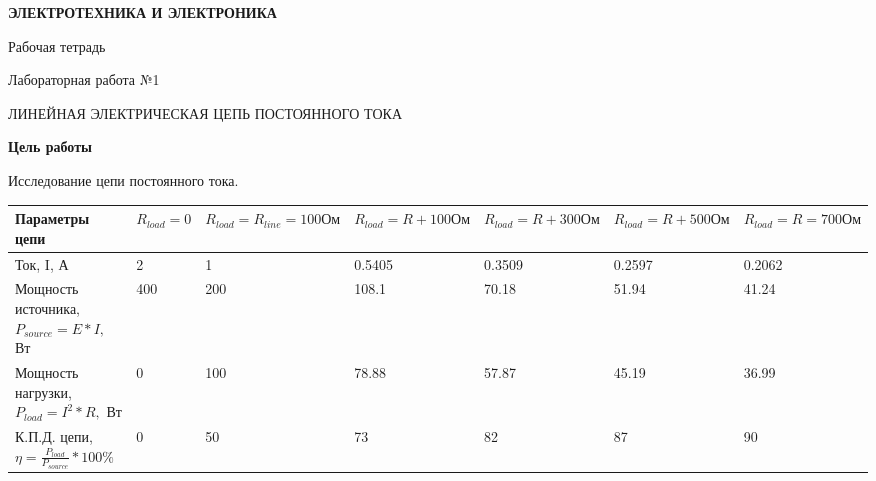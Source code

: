 \documentclass[12pt, a4paper]{report}
\begin{document}

	\begin{titlepage}
		\begin{center}
			\vspace*{1.5cm}

			\LARGE
			\textbf{ЭЛЕКТРОТЕХНИКА И ЭЛЕКТРОНИКА}

			\vspace{5cm}

			\Huge
			Рабочая тетрадь
		\end{center}
	\end{titlepage}
	
	\begin{center}
		Лабораторная работа №1
		
		\large ЛИНЕЙНАЯ ЭЛЕКТРИЧЕСКАЯ ЦЕПЬ ПОСТОЯННОГО ТОКА	

		\textbf{Цель работы}
	\end{center}
	Исследование цепи постоянного тока.
	\newline

	\begin{tabular}{||M{4cm} | M{1.5cm} | M{1.5cm} | M{1.5cm} | M{1.5cm} | M{1.5cm} | M{1.5cm}||}
		\hline 
		Параметры цепи & \( R_{load} = 0 \) & \( R_{load} = R_{line} = 100 Ом \) & \( R_{load} = R + 100 Ом \) & \( R_{load} = R + 300 Ом \) & \( R_{load} = R + 500 Ом \) & \( R_{load} = R = 700 Ом \) \\

		\hline
		Ток, I, А & 2 & 1 & 0.5405 & 0.3509 & 0.2597 & 0.2062 \\

		\hline 
		Мощность источника, \newline \( P_{source} = E*I, \) Вт & 400 & 200 & 108.1 & 70.18 & 51.94 & 41.24 \\

		\hline
		Мощность нагрузки, \newline \( P_{load} = I^2*R, \) Вт & 0 & 100 & 78.88 & 57.87 & 45.19 & 36.99 \\

		\hline
		К.П.Д. цепи, \newline \( \eta = \frac{P_{load}}{P_{source}}*100\% \) & 0 & 50 & 73 & 82 & 87 & 90 \\
		\hline
	\end{tabular}
\end{document}
